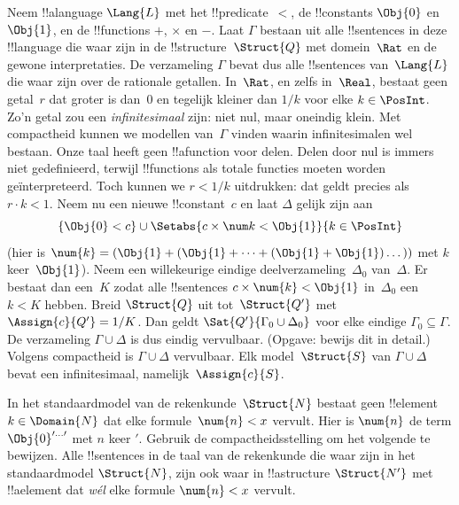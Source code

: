 \documentclass[openany]{memoir}
\begin{document}
{\begin{ex}
Neem !!a{language} $\Lang{L}$ met het !!{predicate}~$<$, de
!!{constant}s $\Obj{0}$ en $\Obj{1}$, en de !!{function}s $+$, $\times$
en $-$. Laat $\Gamma$ bestaan uit alle !!{sentence}s in deze
!!{language} die waar zijn in de !!{structure}~$\Struct{Q}$ met
domein~$\Rat$ en de gewone interpretaties. De verzameling $\Gamma$
bevat dus alle !!{sentence}s van~$\Lang{L}$ die waar zijn over de
rationale getallen. In~$\Rat$, en zelfs in~$\Real$, bestaat geen
getal~$r$ dat groter is dan~$0$ en tegelijk kleiner dan $1/k$ voor elke
$k \in \PosInt$. Zo'n getal zou een \emph{infinitesimaal} zijn: niet nul,
maar oneindig klein. Met compactheid kunnen we modellen van~$\Gamma$
vinden waarin infinitesimalen wel bestaan. Onze taal heeft geen
!!a{function} voor delen. Delen door nul is immers niet gedefinieerd,
terwijl !!{function}s als totale functies moeten worden geïnterpreteerd.
Toch kunnen we $r < 1/k$ uitdrukken: dat geldt precies als
$r \cdot k < 1$. Neem nu een nieuwe !!{constant}~$c$ en laat $\Delta$
gelijk zijn aan
\[
\{\Obj{0} < c\}
\cup \Setabs{ c \times \num k < \Obj{1} }{k \in \PosInt}
\]
(hier is $\num{k} = (\Obj{1} + (\Obj{1} + \dots + (\Obj{1} +
\Obj{1})\dots))$ met $k$ keer~$\Obj{1}$). Neem een willekeurige eindige
deelverzameling~$\Delta_0$ van~$\Delta$. Er bestaat dan een~$K$ zodat
alle !!{sentence}s $c \times \num{k} < \Obj{1}$ in~$\Delta_0$ een
$k < K$ hebben. Breid $\Struct{Q}$ uit tot~$\Struct{Q'}$ met
$\Assign{c}{Q'} = 1/K$. Dan geldt $\Sat{Q'}{\Gamma_0 \cup \Delta_0}$
voor elke eindige $\Gamma_0 \subseteq \Gamma$. De verzameling
$\Gamma \cup \Delta$ is dus eindig vervulbaar. (Opgave: bewijs dit in
detail.) Volgens compactheid is $\Gamma \cup \Delta$ vervulbaar. Elk
model~$\Struct{S}$ van $\Gamma \cup \Delta$ bevat een infinitesimaal,
namelijk~$\Assign{c}{S}$.
\end{ex}
}{}

\begin{prob}
In het standaardmodel van de rekenkunde~$\Struct{N}$ bestaat geen
!!{element}~$k \in \Domain{N}$ dat elke formule~$\num{n} < x$ vervult.
Hier is $\num{n}$ de term $\Obj{0}^{\prime\dots\prime}$ met $n$ keer
$\prime$. Gebruik de compactheidsstelling om het volgende te bewijzen.
Alle !!{sentence}s in de taal van de rekenkunde die waar zijn in het
standaardmodel $\Struct{N}$, zijn ook waar in !!a{structure}
$\Struct{N'}$ met !!a{element} dat \emph{wél} elke formule $\num{n} < x$
vervult.
\end{prob}
\tagendprob
\end{document}
